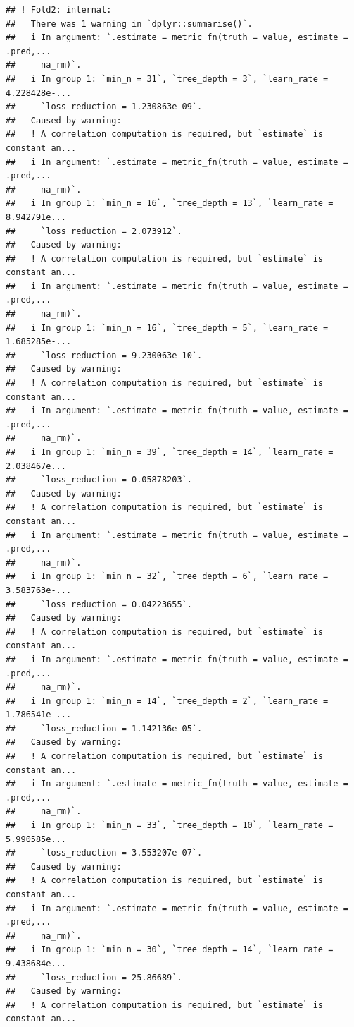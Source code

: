 \documentclass[
]{article}
\begin{document}
\begin{verbatim}
## ! Fold2: internal:
##   There was 1 warning in `dplyr::summarise()`.
##   i In argument: `.estimate = metric_fn(truth = value, estimate = .pred,...
##     na_rm)`.
##   i In group 1: `min_n = 31`, `tree_depth = 3`, `learn_rate = 4.228428e-...
##     `loss_reduction = 1.230863e-09`.
##   Caused by warning:
##   ! A correlation computation is required, but `estimate` is constant an...
##   i In argument: `.estimate = metric_fn(truth = value, estimate = .pred,...
##     na_rm)`.
##   i In group 1: `min_n = 16`, `tree_depth = 13`, `learn_rate = 8.942791e...
##     `loss_reduction = 2.073912`.
##   Caused by warning:
##   ! A correlation computation is required, but `estimate` is constant an...
##   i In argument: `.estimate = metric_fn(truth = value, estimate = .pred,...
##     na_rm)`.
##   i In group 1: `min_n = 16`, `tree_depth = 5`, `learn_rate = 1.685285e-...
##     `loss_reduction = 9.230063e-10`.
##   Caused by warning:
##   ! A correlation computation is required, but `estimate` is constant an...
##   i In argument: `.estimate = metric_fn(truth = value, estimate = .pred,...
##     na_rm)`.
##   i In group 1: `min_n = 39`, `tree_depth = 14`, `learn_rate = 2.038467e...
##     `loss_reduction = 0.05878203`.
##   Caused by warning:
##   ! A correlation computation is required, but `estimate` is constant an...
##   i In argument: `.estimate = metric_fn(truth = value, estimate = .pred,...
##     na_rm)`.
##   i In group 1: `min_n = 32`, `tree_depth = 6`, `learn_rate = 3.583763e-...
##     `loss_reduction = 0.04223655`.
##   Caused by warning:
##   ! A correlation computation is required, but `estimate` is constant an...
##   i In argument: `.estimate = metric_fn(truth = value, estimate = .pred,...
##     na_rm)`.
##   i In group 1: `min_n = 14`, `tree_depth = 2`, `learn_rate = 1.786541e-...
##     `loss_reduction = 1.142136e-05`.
##   Caused by warning:
##   ! A correlation computation is required, but `estimate` is constant an...
##   i In argument: `.estimate = metric_fn(truth = value, estimate = .pred,...
##     na_rm)`.
##   i In group 1: `min_n = 33`, `tree_depth = 10`, `learn_rate = 5.990585e...
##     `loss_reduction = 3.553207e-07`.
##   Caused by warning:
##   ! A correlation computation is required, but `estimate` is constant an...
##   i In argument: `.estimate = metric_fn(truth = value, estimate = .pred,...
##     na_rm)`.
##   i In group 1: `min_n = 30`, `tree_depth = 14`, `learn_rate = 9.438684e...
##     `loss_reduction = 25.86689`.
##   Caused by warning:
##   ! A correlation computation is required, but `estimate` is constant an...

\end{verbatim}
\end{document}
